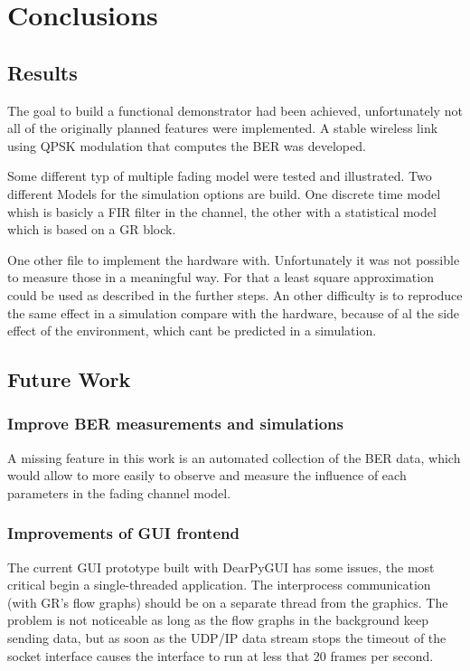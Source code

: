
\chapter{Conclusions} \label{chp:conclusions}

\section{Results}

The goal to build a functional demonstrator had been achieved, unfortunately not all of the originally planned features were implemented. A stable wireless link using QPSK modulation that computes the BER was developed.

Some different typ of multiple fading model were tested and illustrated.
Two different Models for the simulation options are build. One discrete time model whish is  basicly a FIR filter in the channel, the other with a statistical model which is based on a GR block.

One other file to implement the hardware with. Unfortunately it was not possible to measure those in a meaningful way. For that a least square approximation could be used as described in the further steps. An other difficulty is to reproduce the same effect in a simulation compare with the hardware, because of al the side effect of the environment, which cant be predicted in a simulation.


\section{Future Work}

\subsection{Improve BER measurements and simulations}

A missing feature in this work is an automated collection of the BER data, which would allow to more easily to observe and measure the influence of each parameters in the fading channel model.

\subsection{Improvements of GUI frontend}

The current GUI prototype built with DearPyGUI has some issues, the most critical begin a single-threaded application. The interprocess communication (with GR's flow graphs) should be on a separate thread from the graphics. The problem is not noticeable as long as the flow graphs in the background keep sending data, but as soon as the UDP/IP data stream stops the timeout of the socket interface causes the interface to run at less that 20 frames per second.

